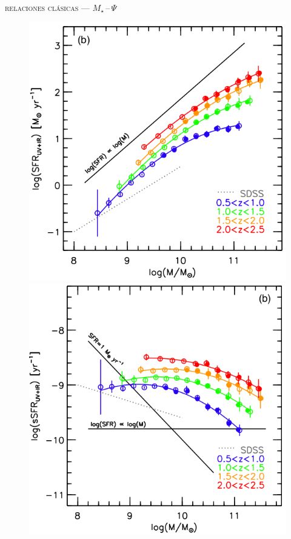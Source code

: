 \documentclass[xcolor=dvipsnames,fleqn,hyperref={colorlinks,citecolor=black,linkcolor=black,urlcolor=black}]{beamer}
\begin{document}
\begin{frame}{\textsc{relaciones clásicas --- $M_\star\,$--$\,\Psi$}}

\begin{figure}
\includegraphics[scale=0.6]{img/whitaker2014-1}
\includegraphics[scale=0.6]{img/whitaker2014-2}
\end{figure}

\end{frame}
\end{document}
